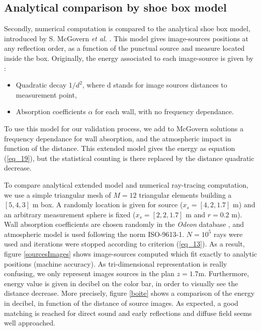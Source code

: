 \documentclass[AMA,STIX1COL]{WileyNJD-v2}
\begin{document}
\subsection{Analytical comparison by shoe box model}
Secondly, numerical computation is compared to the analytical shoe box model, introduced by S. McGovern \textit{et al.} \cite{mcgovern}. This model gives image-sources positions at any reflection order, as a function of the punctual source and measure located inside the box. Originally, the energy associated to each image-source is given by :
\begin{itemize}
\item Quadratic decay $1/d^2$, where d stands for image sources distances to measurement point,  
\item Absorption coefficients $\alpha$ for each wall, with no frequency dependance.
\end{itemize}
To use this model for our validation process, we add to McGovern solutions a frequency dependance for wall absorption, and the atmospheric impact in function of the distance. This extended model gives the energy as equation (\ref{eq_19}), but the statistical counting is there replaced by the distance quadratic decrease.

To compare analytical extended model and numerical ray-tracing computation, we use a simple triangular mesh of $M=12$ triangular elements building a $[5,4,3]$ m box. A randomly location is given for source ($x_s = [4,2,1.7]$ m) and an arbitrary measurement sphere is fixed ($x_s = [2,2,1.7]$ m and $r=0.2$ m). Wall absorption coefficients are chosen randomly in the \textit{Odeon} database \cite{odeon}, and atmospheric model is used following the norm ISO-9613-1\cite{iso}. $N = 10^ 5$ rays were used and iterations were stopped according to criterion (\ref{eq_13}). As a result, figure \ref{sourcesImages} shows image-sources computed which fit exactly to analytic positions (machine accuracy). As tri-dimensional representation is really confusing, we only represent images sources in the plan $z = 1.7$m. Furthermore, energy value is given in decibel on the color bar, in order to visually see the distance decrease. More precisely, figure \ref{boite} shows a comparison of the energy in decibel, in function of the distance of source images. As expected, a good matching is reached for direct sound and early reflections and diffuse field seems well approached. 
 
\end{document}
